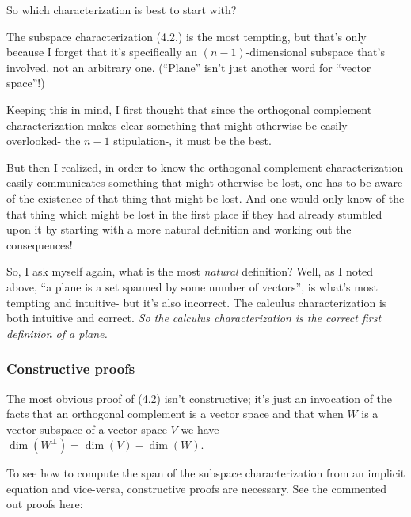 So which characterization is best to start with?

The subspace characterization (4.2.) is the most tempting, but that's only because I forget that it's specifically an $(n - 1)$-dimensional subspace that's involved, not an arbitrary one. (``Plane'' isn't just another word for ``vector space''!)

Keeping this in mind, I first thought that since the orthogonal complement characterization makes clear something that might otherwise be easily overlooked- the $n - 1$ stipulation-, it must be the best.

But then I realized, in order to know the orthogonal complement characterization easily communicates something that might otherwise be lost, one has to be aware of the existence of that thing that might be lost. And one would only know of the that thing which might be lost in the first place if they had already stumbled upon it by starting with a more natural definition and working out the consequences!

So, I ask myself again, what is the most \textit{natural} definition? Well, as I noted above, ``a plane is a set spanned by some number of vectors'', is what's most tempting and intuitive- but it's also incorrect. The calculus characterization is both intuitive and correct. \textit{So the calculus characterization is the correct first definition of a plane.}

\subsubsection*{Constructive proofs}

The most obvious proof of (4.2) isn't constructive; it's just an invocation of the facts that an orthogonal complement is a vector space and that when $W$ is a vector subspace of a vector space $V$ we have $\dim(W^\perp) = \dim(V) - \dim(W)$.

To see how to compute the span of the subspace characterization from an implicit equation and vice-versa, constructive proofs are necessary. See the commented out proofs here:

\vspace{.25cm}

